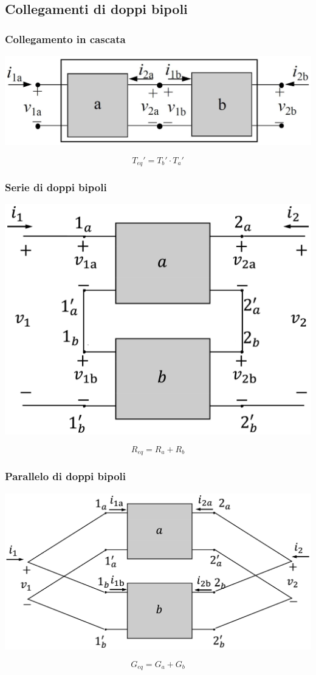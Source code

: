 \documentclass[a4paper]{article}
\begin{document}
\subsection{Collegamenti di doppi bipoli}
\begin{multicols}{2}
	\subsubsection*{Collegamento in cascata}
	\begin{center}
		\includegraphics[width=0.8\linewidth]{dbp_cascata.png}
	\end{center}
	\[T_{eq}' = T_b' \cdot T_a'\]
	
	\subsubsection*{Serie di doppi bipoli}
	\begin{center}
		\includegraphics[width=0.7\linewidth]{dbp_serie.png}
	\end{center}
	\[R_{eq} = R_a + R_b\]
	
	\subsubsection*{Parallelo di doppi bipoli}
	\begin{center}
		\includegraphics[width=0.9\linewidth]{dbp_parallelo.png}
	\end{center}
	\[G_{eq} = G_a + G_b\]


\end{multicols}
\end{document}

